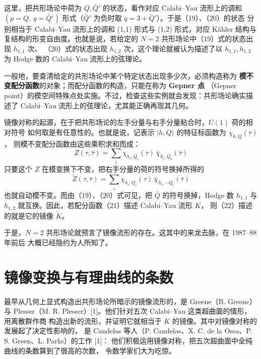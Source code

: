 这里，把共形场论中荷为 $Q,\bar Q'$ 的状态，看作对应 Calabi--Yau 流形上的调和
$(p=Q,\ q=\bar Q')$ 形式（$\bar Q'$ 为负时取 $q=3+\bar Q'$）。于是（19）、（20）的状态
分别相当于 Calabi--Yau 流形上的调和 (1,1) 形式与 (1,2) 形式，对应 Kähler 结构与
复结构的形变自由度。也就是说，若给定的 $N=2$ 共形场论中（19）式的状态出现 $h_{1,1}$ 次、
（20）式的状态出现 $h_{1,2}$ 次，这个理论就被认为描述了以 $h_{1,1},h_{1,2}$ 为 Hodge 数的
Calabi--Yau 流形上的弦理论。

一般地，要查清给定的共形场论中某个特定状态出现多少次，必须构造称为
\textbf{模不变配分函数}的对象；而配分函数的构造，只能在称为 \textbf{Gepner 点}
（Gepner point）的模空间特殊点处实施。不过，检查这些实例就会发现：共形场论确实描述了
Calabi--Yau 流形上的弦理论，尤其能正确再现其几何。

镜像对称的起源，在于把共形场论的左手分量与右手分量粘合时，$U(1)$ 荷的相对符号
如何取是有任意性的。也就是说，记表示 $|h,Q\rangle$ 的特征标函数为 $\chi_{h,Q}(\tau)$，
则模不变配分函数由这些乘积求和而成：
\begin{equation}
  Z(\tau,\bar\tau)=\sum_i \chi_{h_i,Q_i}(\tau)\,\bar\chi_{\bar h_i,\bar Q_i}(\bar\tau) \tag{21}
\end{equation}
只要这个 $Z$ 在模变换下不变，把右手分量的荷的符号换掉所得的
\begin{equation}
  \tilde Z(\tau,\bar\tau)=\sum_i \chi_{h_i,Q_i}(\tau)\,\bar\chi_{\bar h_i,-\bar Q_i}(\bar\tau) \tag{22}
\end{equation}
也就自动模不变。而由（19）、（20）式可见，把 $\bar Q$ 的符号换掉，Hodge 数
$h_{1,1}$ 与 $h_{1,2}$ 就互换。因此，若配分函数（21）描述 Calabi--Yau 流形 $K$，
则（22）描述的就是它的镜像 $\tilde K$。

于是，$N=2$ 共形场论就预言了镜像流形的存在。这其中的来龙去脉，在 1987--88 年前后
大概已经隐约为人所知了。

\section*{镜像变换与有理曲线的条数}

最早从几何上显式构造出共形场论所暗示的镜像流形的，是 Greene（B. Greene）与
Plesser（M. R. Plesser）[1]。他们针对五次 Calabi--Yau 这类超曲面的情形，用离散群作商
构造出新的流形，并证明它就相当于 $K$ 的镜像。其中对镜像对称的发展起了决定性影响的，
是 Candelas 等人（P. Candelas、X. C. de la Ossa、P. S. Green、L. Parks）的工作 [1]：
他们积极运用镜像对称，把五次超曲面中全纯曲线的条数算到了很高的次数，
令数学家们大为吃惊。

